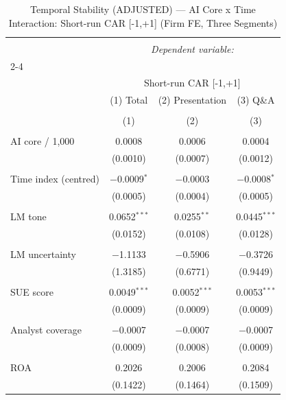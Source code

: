 
\begin{table}[!htbp] \centering 
  \caption{Temporal Stability (ADJUSTED) — AI Core x Time Interaction: Short-run CAR [-1,+1] (Firm FE, Three Segments)} 
  \label{} 
\begin{tabular}{@{\extracolsep{5pt}}lccc} 
\\[-1.8ex]\hline 
\hline \\[-1.8ex] 
 & \multicolumn{3}{c}{\textit{Dependent variable:}} \\ 
\cline{2-4} 
\\[-1.8ex] & \multicolumn{3}{c}{Short-run CAR [-1,+1]} \\ 
 & (1) Total & (2) Presentation & (3) Q\&A \\ 
\\[-1.8ex] & (1) & (2) & (3)\\ 
\hline \\[-1.8ex] 
 AI core / 1,000 & 0.0008 & 0.0006 & 0.0004 \\ 
  & (0.0010) & (0.0007) & (0.0012) \\ 
  & & & \\ 
 Time index (centred) & $-$0.0009$^{*}$ & $-$0.0003 & $-$0.0008$^{*}$ \\ 
  & (0.0005) & (0.0004) & (0.0005) \\ 
  & & & \\ 
 LM tone & 0.0652$^{***}$ & 0.0255$^{**}$ & 0.0445$^{***}$ \\ 
  & (0.0152) & (0.0108) & (0.0128) \\ 
  & & & \\ 
 LM uncertainty & $-$1.1133 & $-$0.5906 & $-$0.3726 \\ 
  & (1.3185) & (0.6771) & (0.9449) \\ 
  & & & \\ 
 SUE score & 0.0049$^{***}$ & 0.0052$^{***}$ & 0.0053$^{***}$ \\ 
  & (0.0009) & (0.0009) & (0.0009) \\ 
  & & & \\ 
 Analyst coverage & $-$0.0007 & $-$0.0007 & $-$0.0007 \\ 
  & (0.0009) & (0.0008) & (0.0009) \\ 
  & & & \\ 
 ROA & 0.2026 & 0.2006 & 0.2084 \\ 
  & (0.1422) & (0.1464) & (0.1509) \\ 

\end{tabular}
\end{table}
